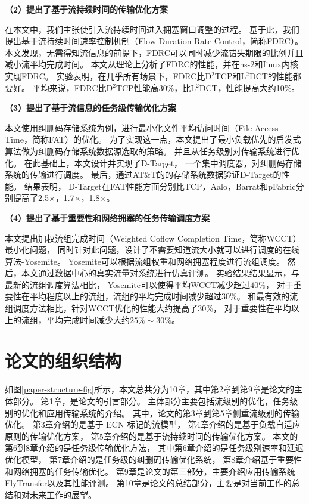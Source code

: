 \textbf{（2）提出了基于流持续时间的传输优化方案}

在本文中，我们主张使引入流持续时间进入拥塞窗口调整的过程。
基于此，我们提出基于流持续时间速率控制机制（Flow Duration Rate Control，简称FDRC）。
本文发现，无需得知流信息的前提下，FDRC可以同时减少流错失期限的比例并且减小流平均完成时间。
本文从理论上分析了FDRC的性能，并在ns-2和Iinux内核实现FDRC。
实验表明，在几乎所有场景下，FDRC比D$^2$TCP和L$^2$DCT的性能都要好。
平均来说，FDRC比D$^2$TCP性能高30$\%$，比L$^2$DCT，性能提高大约10$\%$。



\textbf{（3）提出了基于流信息的任务级传输优化方案}

本文使用纠删码存储系统为例，进行最小化文件平均访问时间（File Access Time，简称FAT）的优化。
为了实现这一点，本文提出了最小负载优先的启发式算法做为纠删码存储系统数据源选取的策略。
并且从任务级别对传输系统进行优化。
在此基础上，本文设计并实现了D-Target，
一个集中调度器，对纠删码存储系统的传输进行调度。
最后，通过AT\&T的的存储系统数据验证D-Target的性能。
结果表明，
D-Target在FAT性能方面分别比TCP，Aalo，Barrat和pFabric分别提高了2.5$\times$，1.7$\times$，1.8$\times$。

\textbf{（4）提出了基于重要性和网络拥塞的任务传输调度方案}

本文提出加权流组完成时间（Weighted Coflow Completion Time，简称WCCT）最小化问题，
同时针对此问题，设计了不需要知道流大小就可以进行调度的在线算法-Yosemite。
Yosemite可以根据流组权重和网络拥塞程度进行流组调度。
然后，本文通过数据中心的真实流量对系统进行仿真评测。
实验结果结果显示，与最新的流组调度算法相比，
Yosemite可以使得平均WCCT减少超过$40\%$，
对于重要性在平均程度以上的流组，流组的平均完成时间减少超过$30\%$。
和最有效的流组调度方法相比，针对WCCT优化的性能大约提高了$30\%$，
对于重要性在平均以上的流组，平均完成时间减少大约$25\%\sim30\%$。


\section{论文的组织结构}
如图\ref{paper-structure-fig}所示，本文总共分为10章，其中第2章到第9章是论文的主体部分。
第1章，是论文的引言部分。
主体部分主要包括流级别的优化，任务级别的优化和应用传输系统的介绍。
其中，论文的第3章到第5章侧重流级别的传输优化。
第3章介绍的是基于 ECN 标记的流模型，
第4章介绍的是基于负载自适应原则的传输优化方案，
第5章介绍的是基于流持续时间的传输优化方案。
本文的第6到8章介绍的是任务级传输优化方法，
其中第6章介绍的是任务级别速率和延迟优化模型，
第7章介绍的是任务级的纠删码传输优化系统，
第8章介绍基于重要性和网络拥塞的任务传输优化。
第9章是论文的第三部分，主要介绍应用传输系统FlyTransfer以及其性能评测。
第10章是论文的总结部分，主要是对当前工作的总结和对未来工作的展望。


